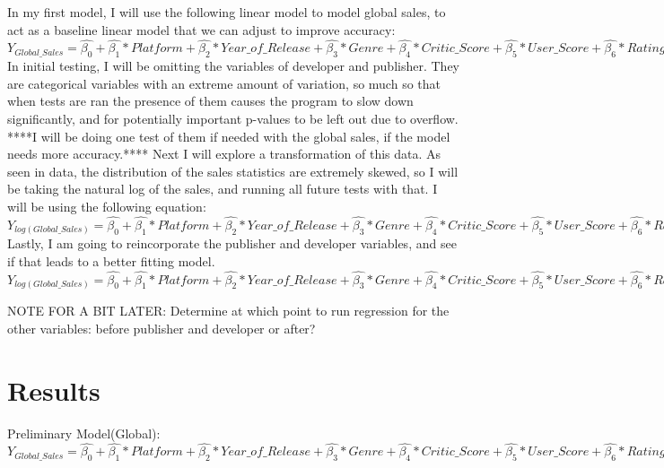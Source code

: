 \documentclass[12pt]{article}
\begin{document}
In my first model, I will use the following linear model to model global sales, to act as a baseline linear model that we can adjust to improve accuracy:
$Y_{Global\_Sales}=\hat{\beta_{0}}+\hat{\beta_{1}}*Platform+\hat{\beta_{2}}*Year\_of\_Release+\hat{\beta_{3}}*Genre+\hat{\beta_{4}}*Critic\_Score+\hat{\beta_{5}}*User\_Score+\hat{\beta_{6}}*Rating+\hat{\beta_{7}}*Critic\_Count+\hat{\beta_{8}}*Critic\_Count$
In initial testing, I will be omitting the variables of developer and publisher. They are categorical variables with an extreme amount of variation,
so much so that when tests are ran the presence of them causes the program to slow down significantly, and for potentially important p-values to be left out due to overflow.
****I will be doing one test of them if needed with the global sales, if the model needs more accuracy.****
Next I will explore a transformation of this data. As seen in data, the distribution of the sales statistics are extremely skewed, so I will be taking  
the natural log of the sales, and running all future tests with that. I will be using the following equation:
$Y_{log(Global\_Sales)}=\hat{\beta_{0}}+\hat{\beta_{1}}*Platform+\hat{\beta_{2}}*Year\_of\_Release+\hat{\beta_{3}}*Genre+\hat{\beta_{4}}*Critic\_Score+\hat{\beta_{5}}*User\_Score+\hat{\beta_{6}}*Rating+\hat{\beta_{7}}*Critic\_Count+\hat{\beta_{8}}*Critic\_Count$
Lastly, I am going to reincorporate the publisher and developer variables, and see if that leads to a better fitting model.
$Y_{log(Global\_Sales)}=\hat{\beta_{0}}+\hat{\beta_{1}}*Platform+\hat{\beta_{2}}*Year\_of\_Release+\hat{\beta_{3}}*Genre+\hat{\beta_{4}}*Critic\_Score+\hat{\beta_{5}}*User\_Score+\hat{\beta_{6}}*Rating+\hat{\beta_{7}}*Critic\_Count+\hat{\beta_{8}}*Critic\_Count+\hat{\beta_{9}}*Developer+\hat{\beta_{10}}*Publisher$

NOTE FOR A BIT LATER: Determine at which point to run regression for the other variables: before publisher and developer or after?


\section{Results}
\label{sec:resu}
Preliminary Model(Global):
$Y_{Global\_Sales}=\hat{\beta_{0}}+\hat{\beta_{1}}*Platform+\hat{\beta_{2}}*Year\_of\_Release+\hat{\beta_{3}}*Genre+\hat{\beta_{4}}*Critic\_Score+\hat{\beta_{5}}*User\_Score+\hat{\beta_{6}}*Rating+\hat{\beta_{7}}*Critic\_Count+\hat{\beta_{8}}*Critic\_Count$
\end{document}
